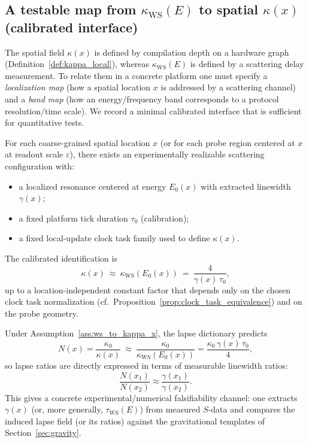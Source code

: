 \subsection{A testable map from \texorpdfstring{$\kappa_{\mathrm{WS}}(E)$}{kappaWS(E)} to spatial \texorpdfstring{$\kappa(x)$}{kappa(x)} (calibrated interface)}
\label{app:wigner_smith_calibrated_map}

The spatial field $\kappa(x)$ is defined by compilation depth on a hardware graph (Definition~\ref{def:kappa_local}), whereas $\kappa_{\mathrm{WS}}(E)$ is defined by a scattering delay measurement.
To relate them in a concrete platform one must specify a \emph{localization map} (how a spatial location $x$ is addressed by a scattering channel) and a \emph{band map} (how an energy/frequency band corresponds to a protocol resolution/time scale).
We record a minimal calibrated interface that is sufficient for quantitative tests.

\begin{assumption}
\label{ass:ws_to_kappa_x}
For each coarse-grained spatial location $x$ (or for each probe region centered at $x$ at readout scale $\varepsilon$), there exists an experimentally realizable scattering configuration with:
\begin{itemize}
\item a localized resonance centered at energy $E_0(x)$ with extracted linewidth $\gamma(x)$;
\item a fixed platform tick duration $\tau_0$ (calibration);
\item a fixed local-update clock task family used to define $\kappa(x)$.
\end{itemize}
The calibrated identification is
\begin{equation}
\label{eq:ws_to_kappa_x}
\kappa(x)\ \approx\ \kappa_{\mathrm{WS}}(E_0(x))\ =\ \frac{4}{\gamma(x)\,\tau_0},
\end{equation}
up to a location-independent constant factor that depends only on the chosen clock task normalization (cf.\ Proposition~\ref{prop:clock_task_equivalence}) and on the probe geometry.
\end{assumption}

\begin{remark}
\label{rem:ws_test_form}
Under Assumption~\ref{ass:ws_to_kappa_x}, the lapse dictionary predicts
\[
N(x)=\frac{\kappa_0}{\kappa(x)}
\ \approx\
\frac{\kappa_0}{\kappa_{\mathrm{WS}}(E_0(x))}
=\frac{\kappa_0\,\gamma(x)\,\tau_0}{4},
\]
so lapse ratios are directly expressed in terms of measurable linewidth ratios:
\[
\frac{N(x_1)}{N(x_2)}\approx \frac{\gamma(x_1)}{\gamma(x_2)}.
\]
This gives a concrete experimental/numerical falsifiability channel: one extracts $\gamma(x)$ (or, more generally, $\tau_{\mathrm{WS}}(E)$) from measured $S$-data and compares the induced lapse field (or its ratios) against the gravitational templates of Section~\ref{sec:gravity}.
\end{remark}

